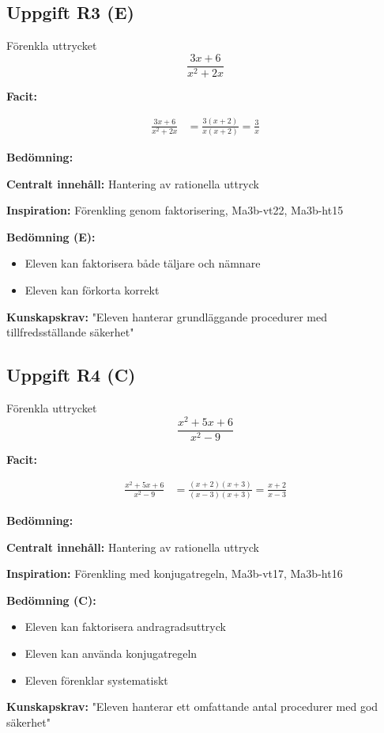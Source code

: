 \documentclass[12pt]{article}
\begin{document}
\subsection*{Uppgift R3 (E)}
Förenkla uttrycket
\[
\frac{3x + 6}{x^2 + 2x}
\]

\begin{facitbox}
\textbf{Facit:}

\begin{align*}
\frac{3x + 6}{x^2 + 2x} &= \frac{3(x + 2)}{x(x + 2)} = \frac{3}{x}
\end{align*}
\end{facitbox}

\begin{refbox}
\textbf{Bedömning:}

\textbf{Centralt innehåll:} Hantering av rationella uttryck

\textbf{Inspiration:} Förenkling genom faktorisering, Ma3b-vt22, Ma3b-ht15

\textbf{Bedömning (E):}
\begin{itemize}
    \item Eleven kan faktorisera både täljare och nämnare
    \item Eleven kan förkorta korrekt
\end{itemize}

\textbf{Kunskapskrav:} "Eleven hanterar grundläggande procedurer med tillfredsställande säkerhet"
\end{refbox}

\subsection*{Uppgift R4 (C)}
Förenkla uttrycket
\[
\frac{x^2 + 5x + 6}{x^2 - 9}
\]

\begin{facitbox}
\textbf{Facit:}

\begin{align*}
\frac{x^2 + 5x + 6}{x^2 - 9} &= \frac{(x + 2)(x + 3)}{(x - 3)(x + 3)} = \frac{x + 2}{x - 3}
\end{align*}
\end{facitbox}

\begin{refbox}
\textbf{Bedömning:}

\textbf{Centralt innehåll:} Hantering av rationella uttryck

\textbf{Inspiration:} Förenkling med konjugatregeln, Ma3b-vt17, Ma3b-ht16

\textbf{Bedömning (C):}
\begin{itemize}
    \item Eleven kan faktorisera andragradsuttryck
    \item Eleven kan använda konjugatregeln
    \item Eleven förenklar systematiskt
\end{itemize}

\textbf{Kunskapskrav:} "Eleven hanterar ett omfattande antal procedurer med god säkerhet"
\end{refbox}
\end{document}
